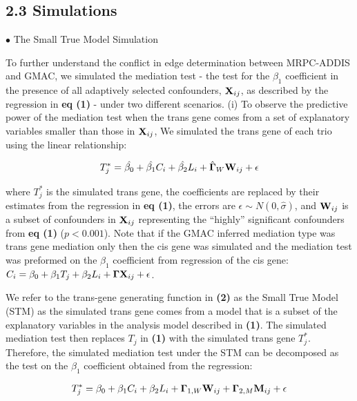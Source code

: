 \documentclass[
]{article}
\begin{document}
\subsection*{2.3 Simulations}

\indent \(\bullet\) The Small True Model Simulation

To further understand the conflict in edge determination between
MRPC-ADDIS and GMAC, we simulated the mediation test - the test for the
\(\beta_1\) coefficient in the presence of all adaptively selected
confounders, \({\bf X}_{ij}\), as described by the regression in
\textbf{eq (1)} - under two different scenarios. (i) To observe the
predictive power of the mediation test when the trans gene comes from a
set of explanatory variables smaller than those in \({\bf X}_{ij}\), We
simulated the trans gene of each trio using the linear relationship:

\begin{eqnarray} T^{\ast}_{j} = \hat{\beta_0}+\hat{\beta_1}C_i + \hat{\beta_2}L_i + \hat{{\bf\Gamma}}_W {\bf W}_{ij} +\epsilon  \end{eqnarray}

where \(T^{\ast}_{j}\) is the simulated trans gene, the coefficients are
replaced by their estimates from the regression in \textbf{eq (1)}, the
errors are \(\epsilon \sim N(0, \hat{\sigma})\), and \({\bf W}_{ij}\) is
a subset of confounders in \({\bf X}_{ij}\) representing the ``highly''
significant confounders from \textbf{eq (1)} (\(p<0.001\)). Note that if
the GMAC inferred mediation type was trans gene mediation only then the
cis gene was simulated and the mediation test was preformed on the
\(\beta_1\) coefficient from regression of the cis gene:
\(C_i = \beta_0 + \beta_1T_j + \beta_2L_i + {\bf \Gamma X}_{ij}+\epsilon\).

We refer to the trans-gene generating function in \textbf{(2)} as the
Small True Model (STM) as the simulated trans gene comes from a model
that is a subset of the explanatory variables in the analysis model
described in \textbf{(1)}. The simulated mediation test then replaces
\(T_j\) in \textbf{(1)} with the simulated trans gene \(T^{\ast}_j\).
Therefore, the simulated mediation test under the STM can be decomposed
as the test on the \(\beta_1\) coefficient obtained from the regression:

\begin{eqnarray} T^{\ast}_{j} = \beta_0+\beta_1C_i + \beta_2L_i + {\bf\Gamma}_{1,W} {\bf W}_{ij} + {\bf \Gamma}_{2,M}{\bf M}_{ij} +\epsilon \end{eqnarray}
\end{document}
